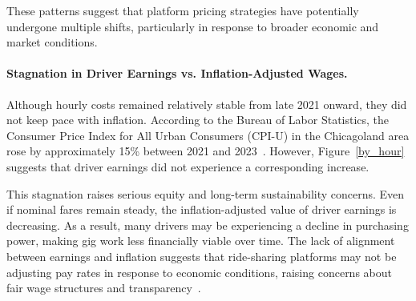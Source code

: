 These patterns suggest that platform pricing strategies have potentially undergone multiple shifts, particularly in response to broader economic and market conditions.


\paragraph{\textbf{Stagnation in Driver Earnings vs. Inflation-Adjusted Wages.}}

Although hourly costs remained relatively stable from late 2021 onward, they did not keep pace with inflation. According to the Bureau of Labor Statistics, the Consumer Price Index for All Urban Consumers (CPI-U) in the Chicagoland area rose by approximately 15\% between 2021 and 2023~\cite{BLS_CPI}. However, Figure~\ref{by_hour} suggests that driver earnings did not experience a corresponding increase.

This stagnation raises serious equity and long-term sustainability concerns. Even if nominal fares remain steady, the inflation-adjusted value of driver earnings is decreasing. As a result, many drivers may be experiencing a decline in purchasing power, making gig work less financially viable over time. The lack of alignment between earnings and inflation suggests that ride-sharing platforms may not be adjusting pay rates in response to economic conditions, raising concerns about fair wage structures and transparency~\cite{angrist2021uber}.




